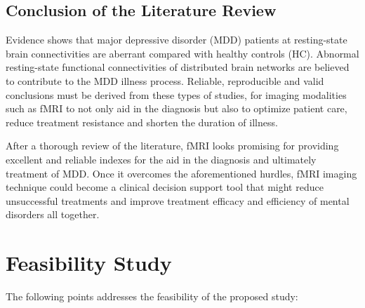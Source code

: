 ﻿\documentclass[12pt]{article}
\begin{document}
\subsection*{Conclusion of the Literature Review}

Evidence shows that major depressive disorder (MDD) patients at
resting-state brain connectivities are aberrant compared with healthy
controls (HC). Abnormal resting-state functional connectivities of
distributed brain networks are believed to contribute to the MDD
illness process. Reliable, reproducible and valid conclusions must be
derived from these types of studies, for imaging modalities such as
fMRI to not only aid in the diagnosis but also to optimize patient
care, reduce treatment resistance and shorten the duration of illness.

\vspace{-5pt}
\enlargethispage{\baselineskip}
After a thorough review of the literature, fMRI looks promising for
providing excellent and reliable indexes for the aid in the diagnosis
and ultimately treatment of MDD. Once it overcomes the aforementioned
hurdles, fMRI imaging technique could become a clinical decision
support tool that might reduce unsuccessful treatments and improve
treatment efficacy and efficiency of mental disorders all together.

\newpage
\section{Feasibility Study}

The following points addresses the feasibility of the proposed study:
\end{document}
